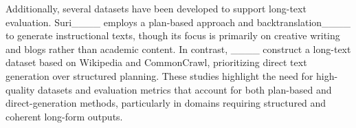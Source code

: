 Additionally, several datasets have been developed to support long-text evaluation. Suri____ employs a plan-based approach and backtranslation____ to generate instructional texts, though its focus is primarily on creative writing and blogs rather than academic content. In contrast, ____ construct a long-text dataset based on Wikipedia and CommonCrawl, prioritizing direct text generation over structured planning. These studies highlight the need for high-quality datasets and evaluation metrics that account for both plan-based and direct-generation methods, particularly in domains requiring structured and coherent long-form outputs.





